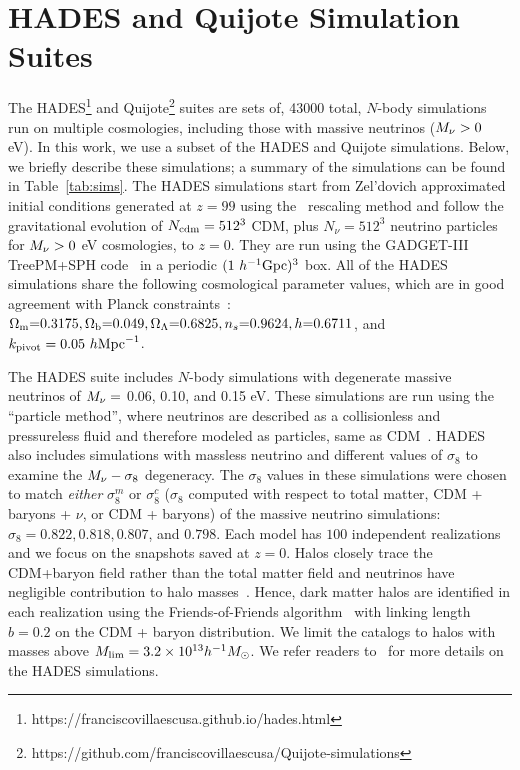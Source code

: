 \section{HADES and Quijote Simulation Suites} \label{sec:hades} 
The HADES\footnote{https://franciscovillaescusa.github.io/hades.html} and 
Quijote\footnote{https://github.com/franciscovillaescusa/Quijote-simulations}
suites are sets of, 43000 total, $N$-body simulations run on multiple cosmologies,
including those with massive neutrinos ($M_\nu > 0$ eV). In this work, 
we use a subset of the HADES and Quijote simulations. Below, we briefly describe these simulations; 
a summary of the simulations can be found in Table~\ref{tab:sims}. 
The HADES simulations start from Zel'dovich approximated initial conditions 
generated at $z=99$ using the~\cite{zennaro2017a} rescaling method and follow 
the gravitational evolution of $N_{\rm cdm}=512^3$ CDM, plus $N_{\nu}=512^3$ 
neutrino particles for $M_\nu > 0$ eV cosmologies, to $z=0$. They are run using 
the {\sc GADGET-III} TreePM+SPH code~\citep{springel2005} in a periodic 
$(1~h^{-1}{\rm Gpc})^3$ box. All of the HADES simulations share the following 
cosmological parameter values, which are in good agreement with Planck 
constraints~\cite{ade2016a}: $\Omega_{\rm m}{=}0.3175, \Omega_{\rm b}{=}0.049, \Omega_\Lambda{=}0.6825, n_s{=}0.9624, h{=}0.6711$, 
and $k_{\rm pivot} = 0.05~h{\rm Mpc}^{-1}$. 

The HADES suite includes $N$-body simulations with degenerate massive neutrinos 
of $M_\nu = $ 0.06, 0.10, and 0.15 eV. These simulations are run using the 
``particle method'', where neutrinos are described as a collisionless 
and pressureless fluid and therefore modeled as particles, same as 
CDM~\citep{brandbyge2008,viel2010}. HADES also includes simulations with massless 
neutrino and different values of $\sigma_8$ to examine the $M_\nu-\sigma_8$ 
degeneracy. The $\sigma_8$ values in these simulations were chosen to match {\em either} 
$\sigma_8^m$ or $\sigma_8^{c}$ ($\sigma_8$ computed with respect to total matter, 
CDM + baryons + $\nu$, or CDM + baryons) of the massive neutrino simulations: 
$\sigma_8 = 0.822, 0.818, 0.807$, and $0.798$. Each model has $100$ independent 
realizations and we focus on the snapshots saved at $z = 0$. Halos closely 
trace the CDM+baryon field rather than the total matter field and neutrinos 
have negligible contribution to halo masses~\citep[\emph{e.g.}][]{ichiki2012, castorina2014, loverde2014, villaescusa-navarro2014}.
Hence, dark matter halos are identified in each realization using the Friends-of-Friends 
algorithm~\cite[FoF;][]{davis1985} with linking length $b=0.2$ on the CDM + baryon
distribution. We limit the catalogs to halos with masses above 
$M_{\rm lim} = 3.2\times 10^{13} h^{-1}M_\odot$. We refer readers
to~\cite{villaescusa-navarro2018} for more details on the HADES simulations. 

